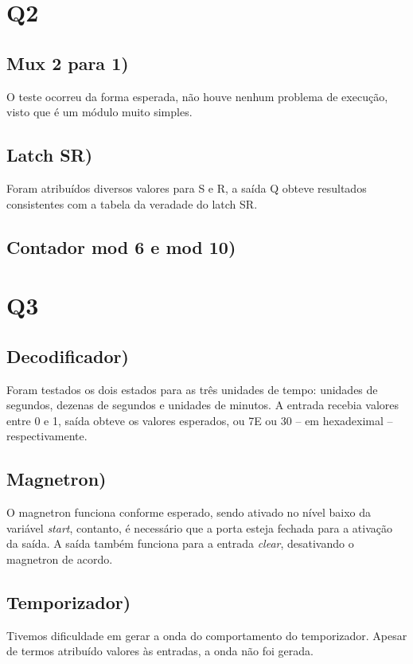\documentclass[12pt]{article}
\begin{document}
\section*{Q2}

\subsection*{Mux 2 para 1)} O teste ocorreu da forma esperada, não houve nenhum problema de execução, visto que é um módulo muito simples.

\subsection*{Latch SR)}  Foram atribuídos diversos valores para S e R, a saída Q obteve resultados consistentes com a tabela da veradade do latch SR.



\subsection*{Contador mod 6 e mod 10)} 


\section*{Q3}

\subsection*{Decodificador)} Foram testados os dois estados para as três unidades de tempo: unidades de segundos, dezenas de segundos e unidades de minutos. A entrada recebia valores entre 0 e 1, saída obteve os valores esperados, ou 7E ou 30 – em hexadeximal – respectivamente.


\subsection*{Magnetron)} O magnetron funciona conforme esperado, sendo ativado no nível baixo da variável \textit{start}, contanto, é necessário que a porta esteja fechada para a ativação da saída. A saída também funciona para a entrada \textit{clear}, desativando o magnetron de acordo.

\subsection*{Temporizador)} Tivemos dificuldade em gerar a onda do comportamento do temporizador. Apesar de termos atribuído valores às entradas, a onda não foi gerada.
\end{document}
